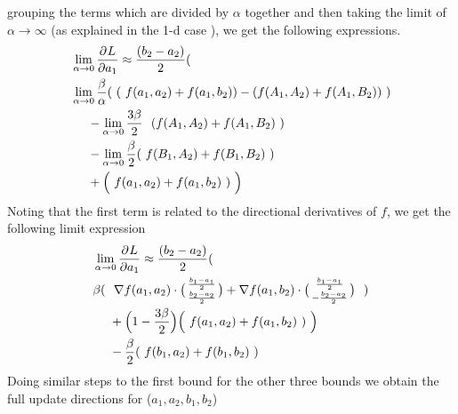 grouping the terms which are divided by $\alpha$ together and then taking the limit of $\alpha \rightarrow \infty $ (as explained in the 1-d case ), we get the following expressions.
\begin{equation}
\begin{aligned} 
& \lim_{\alpha \to 0} \frac{\partial^{} L}{\partial a_{1}} \approx \frac{(b_{2}-a_{2})}{2}( \\
&\lim_{\alpha \to 0} \frac{\beta}{\alpha}(~(~f(a_{1},a_{2}) + f(a_{1},b_{2})) - (f(A_{1},A_{2}) + f(A_{1},B_{2})) ~)\\ &~~~~-\lim_{\alpha \to 0}\frac{3\beta}{2} ~~(f(A_{1},A_{2}) + f(A_{1},B_{2}) ~) \\ &~~~~-\lim_{\alpha \to 0} \frac \beta2 (~f(B_{1},A_{2}) + f(B_{1},B_{2})~)\\
&~~~~+ \Big(~f(a_{1},a_{2}) + f(a_{1},b_{2})~)~\Big)
\label{eq:update-outer-2-w-2}
\end{aligned}
\end{equation}
Noting that the first term is related to the directional derivatives of $f$, we get the following limit expression
\begin{equation}
\begin{aligned} 
& \lim_{\alpha \to 0} \frac{\partial^{} L}{\partial a_{1}} \approx \frac{(b_{2}-a_{2})}{2}( \\
&\beta(~~\nabla f(a_1,a_2)\cdot \bigl( \begin{smallmatrix} \frac{b_1 -a_1 }{2}\\ \frac{b_2 -a_2}{2} \end{smallmatrix} \bigr) + \nabla f(a_1,b_2)\cdot \bigl( \begin{smallmatrix} \frac{b_1 -a_1 }{2}\\ -\frac{b_2 -a_2}{2} \end{smallmatrix} \bigr)~~)\\ &~~~~+\Big(1-\frac{3\beta}{2}\Big)               \Big(~f(a_{1},a_{2}) + f(a_{1},b_{2})~)~\Big) \\ &~~~~- \frac \beta2 (~f(b_{1},a_{2}) + f(b_{1},b_{2})~)
\label{eq:update-outer-2-w-3}
\end{aligned}
\end{equation}
Doing similar steps to the first bound for the other three bounds we obtain the full update directions for ($a_1 ,a_2 ,b_1 ,b_2$)
